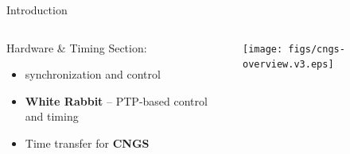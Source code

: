 \documentclass[compress,red]{beamer}
\begin{document}
\begin{frame}{Introduction}

\begin{columns}[c]

     \begin{block}{Hardware \& Timing Section:} 
	\begin{itemize}
	  \item synchronization and control
	  \item \textbf{White Rabbit} -- PTP-based control and timing 
	  \item Time transfer for \textbf{CNGS}
	\end{itemize}
     \end{block}

    \begin{center}
\pause
      \texttt{[image: figs/cngs-overview.v3.eps]}
    \end{center}
\end{columns}

\end{frame}
\end{document}
